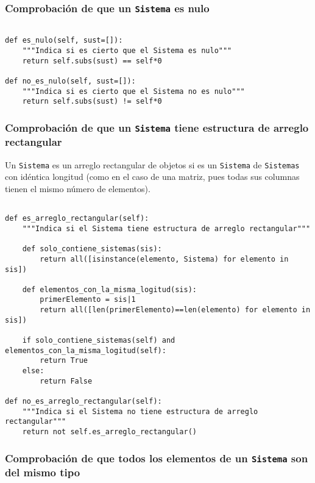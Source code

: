 \documentclass[11pt]{report}
\begin{document}
\subsubsection{Comprobación de que un \texttt{Sistema} es nulo}
\label{sec:org63c26ff}

\begin{verbatim}

def es_nulo(self, sust=[]):
    """Indica si es cierto que el Sistema es nulo"""
    return self.subs(sust) == self*0

def no_es_nulo(self, sust=[]):
    """Indica si es cierto que el Sistema no es nulo"""
    return self.subs(sust) != self*0

\end{verbatim}

\subsubsection{Comprobación de que un \texttt{Sistema}  tiene estructura de arreglo rectangular}
\label{sec:org2373686}

Un \texttt{Sistema} es un arreglo rectangular de objetos si es un \texttt{Sistema}
de \texttt{Sistemas} con idéntica longitud (como en el caso de una matriz,
pues todas sus columnas tienen el mismo número de elementos).
\begin{verbatim}

def es_arreglo_rectangular(self):
    """Indica si el Sistema tiene estructura de arreglo rectangular"""

    def solo_contiene_sistemas(sis):
        return all([isinstance(elemento, Sistema) for elemento in sis])

    def elementos_con_la_misma_logitud(sis):
        primerElemento = sis|1
        return all([len(primerElemento)==len(elemento) for elemento in sis])

    if solo_contiene_sistemas(self) and elementos_con_la_misma_logitud(self):
        return True
    else:
        return False

def no_es_arreglo_rectangular(self):
    """Indica si el Sistema no tiene estructura de arreglo rectangular"""
    return not self.es_arreglo_rectangular()

\end{verbatim}

\subsubsection{Comprobación de que todos los elementos de un \texttt{Sistema} son del mismo tipo}
\label{sec:orgf6a734b}
\end{document}

